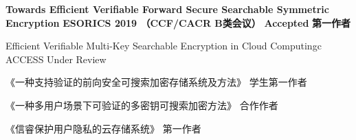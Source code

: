 \documentclass[zh]{resume}
\begin{document}
\begin{myresearchs}
  \myresearch
    {\textbf{Towards Efficient Verifiable Forward Secure Searchable Symmetric Encryption}}
    {\textbf{ESORICS 2019 （CCF/CACR B类会议）}}
    {\textbf{Accepted}}
    {\textbf{第一作者}}%

  \myresearch
    {Efficient Verifiable Multi-Key Searchable Encryption in Cloud Computingc}
    {ACCESS}
    {Under Review}
    { }

  \myzhuanli
    {《一种支持验证的前向安全可搜索加密存储系统及方法》}
    {学生第一作者}

  \myzhuanli
    {《一种多用户场景下可验证的多密钥可搜索加密方法》}
    {合作作者}

  \myruanzhu
    {《信睿保护用户隐私的云存储系统》}
    {第一作者}

\end{myresearchs}
\end{document}
